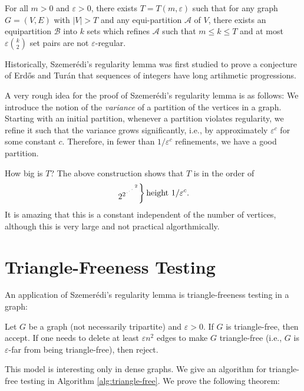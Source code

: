 \documentclass[10pt]{article}
\begin{document}
\begin{theorem}
  For all $m > 0$ and $\varepsilon > 0$, there exists $T = T(m, \varepsilon)$ such that for any graph $G = (V, E)$ with $|V| > T$ and any equi-partition $\mathcal A$ of $V$, there exists an equipartition $\mathcal B$ into $k$ sets which refines $\mathcal A$ such that $m \leq k \leq T$ and at most $\varepsilon \binom{k}{2}$ set pairs are not $\varepsilon$-regular.
\end{theorem}

Historically, Szemer\'edi's regularity lemma was first studied to prove a conjecture of Erd\H{o}s and Tur\'an that sequences of integers have long artihmetic progressions.

A very rough idea for the proof of Szemer\'edi's regularity lemma is as follows: We introduce the notion of the \emph{variance} of a partition of the vertices in a graph. Starting with an initial partition, whenever a partition violates regularity, we refine it such that the variance grows significantly, i.e., by approximately $\varepsilon^c$ for some constant $c$. Therefore, in fewer than $1/\varepsilon^c$ refinements, we have a good partition.

How big is $T$? The above construction shows that $T$ is in the order of
$$ \begin{rcases}
  2^{2^{\iddots^{\;2}}}
\end{rcases}\text{height $1/\varepsilon^c$}. $$
It is amazing that this is a constant independent of the number of vertices, although this is very large and not practical algorthmically.

\section{Triangle-Freeness Testing}

An application of Szemer\'edi's regularity lemma is triangle-freeness testing in a graph:

\begin{problem}
  Let $G$ be a graph (not necessarily tripartite) and $\varepsilon > 0$. If $G$ is triangle-free, then accept. If one needs to delete at least $\varepsilon n^2$ edges to make $G$ triangle-free (i.e., $G$ is $\varepsilon$-far from being triangle-free), then reject.
\end{problem}

This model is interesting only in dense graphs. We give an algorithm for triangle-free testing in Algorithm \ref{alg:triangle-free}. We prove the following theorem:
\end{document}
